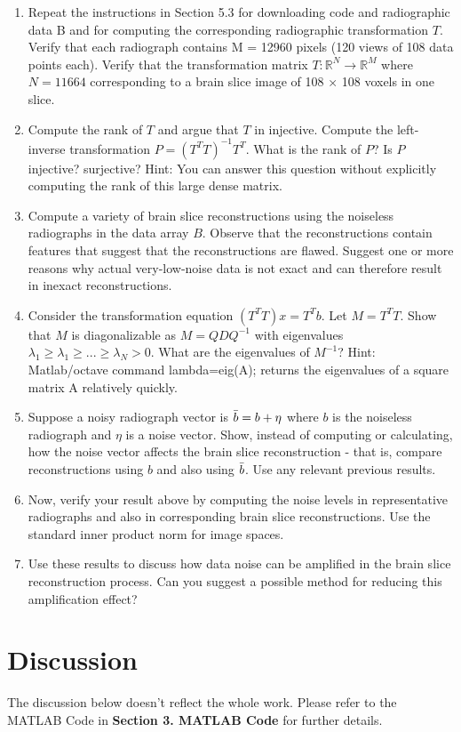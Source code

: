 \documentclass{article}
\begin{document}
\begin{enumerate}
    \item Repeat the instructions in Section 5.3 for downloading code and radiographic data B and for computing the corresponding radiographic transformation $T$. Verify that each radiograph contains M = 12960 pixels (120 views of 108 data points each). Verify that the transformation matrix $T : \mathbb{R}^{N} \to \mathbb{R}^{M}$ where $N = 11664$ corresponding to a brain slice image of 108 × 108 voxels in one slice.
    \item Compute the rank of $T$ and argue that $T$ in injective. Compute the left-inverse transformation $P = (T^TT)^{-1}T^T$. What is the rank of $P$? Is $P$ injective? surjective? Hint: You can answer this question without explicitly computing the rank of this large dense matrix.
    \item Compute a variety of brain slice reconstructions using the noiseless radiographs in the data array $B$. Observe that the reconstructions contain features that suggest that the reconstructions are flawed. Suggest one or more reasons why actual very-low-noise data is not exact and can therefore result in inexact reconstructions.
    \item Consider the transformation equation $(T^TT)x = T^Tb$. Let $M = T^TT$. Show that $M$ is diagonalizable as $M = QDQ^{-1}$ with eigenvalues $\lambda_1 \ge \lambda_1 \ge ... \ge \lambda_N > 0$. What are the eigenvalues of $M^{-1}$? Hint: Matlab/octave command lambda=eig(A); returns the eigenvalues of a square matrix A relatively quickly.
    \item Suppose a noisy radiograph vector is $\Bar{b} = b + \eta$ where $b$ is the noiseless radiograph and $\eta$ is a noise vector. Show, instead of computing or calculating, how the noise vector affects the brain slice reconstruction - that is, compare reconstructions using $b$ and also using $\Bar{b}$. Use any relevant previous results.
    \item Now, verify your result above by computing the noise levels in representative radiographs and also in corresponding brain slice reconstructions. Use the standard inner product norm for image spaces.
    \item Use these results to discuss how data noise can be amplified in the brain slice reconstruction process. Can you suggest a possible method for reducing this amplification effect?
\end{enumerate}
\pagebreak
\section{Discussion}
The discussion below doesn't reflect the whole work. Please refer to the MATLAB Code in \textbf{Section 3. MATLAB Code} for further details.
\end{document}

